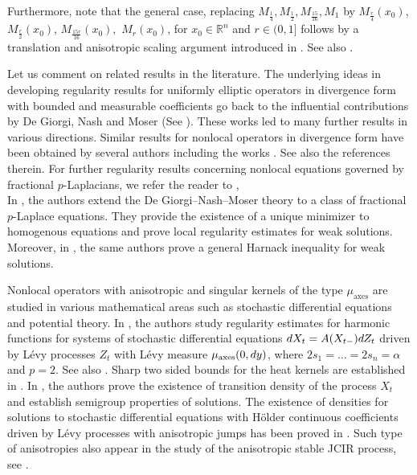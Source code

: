 \documentclass[11pt]{amsart}
\theoremstyle{plain}
\theoremstyle{definition}
\numberwithin{equation}{section}
\renewcommand{\d}{\textnormal{d}}
\newcommand{\R}{\mathbb{R}}
\newcommand{\ma}{\mu_{\mathrm{axes}}}
\begin{document}
Furthermore, note that the general case, replacing $M_{\frac{1}{4}}, M_{\frac{1}{2}}, M_{\frac{15}{16}}, M_1$ by $M_{\frac{r}{4}}(x_0)$, $M_{\frac{r}{2}}(x_0)$, $M_{\frac{15r}{16}}(x_0),$ $M_r(x_0)$, for $x_0\in\R^n$ and $r\in(0,1]$ follows by a translation and anisotropic scaling argument introduced in . See also \cite{CK20}.

Let us comment on related results in the literature. 
The underlying ideas in developing regularity results for uniformly elliptic operators in divergence form with bounded and measurable coefficients go back to the influential contributions by De Giorgi, Nash and Moser (See \cite{DEGIORGI, NASH, MOSER}). These works led to many further results in various directions.
Similar results for nonlocal operators in divergence form have been obtained by several authors including the works \cite{Kin20, Bar09, BLH, CAFFVASS, KUMA, CHENKUMAWANG,Coz17, DCKP16, DyKa17, FallReg, KASFELS,  kassmann-apriori, KassSchwab, KuMiSi15, Rod21, Ming11, Mosconi,  Str17, Str18}. See also the references therein. For further regularity results concerning nonlocal equations governed by fractional $p$-Laplacians, we refer the reader to \cite{KuMiSi15, ToIrFe15, NOW20, NOW21, NOW21b, NOW21c, BrLiSc18}, \\
In \cite{DCKP16}, the authors extend the De Giorgi--Nash--Moser theory to a class of fractional $p$-Laplace equations. They provide the existence of a unique minimizer to homogenous equations and prove local regularity estimates for weak solutions. Moreover, in \cite{DCKP14}, the same authors prove a general Harnack inequality for weak solutions. 

Nonlocal operators with anisotropic and singular kernels of the type $\ma$ are studied in various mathematical areas such as stochastic differential equations and potential theory. In \cite{BaCh10}, the authors study regularity estimates for harmonic functions for systems of stochastic differential equations $\d X_t=A(X_{t-})\d Z_t$ driven by L\'evy processes $Z_t$ with L\'evy measure $\ma(0,\d y)$, where $2s_1=\dots=2s_n=\alpha$ and $p=2$. See also \cite{ZHANG15, Cha20, ROV16}. Sharp two sided bounds for the heat kernels are established in \cite{KuRy17, KKK19}. In \cite{KuRy20}, the authors prove the existence of transition density of the process $X_t$ and establish semigroup properties of solutions. 
The existence of densities for solutions to stochastic differential equations with H\"older continuous coefficients driven by L\'evy processes with anisotropic jumps has been proved in \cite{FRIPERU18}.
Such type of anisotropies also appear in the study of the anisotropic stable JCIR process, see \cite{FriPen20}.
\end{document}

